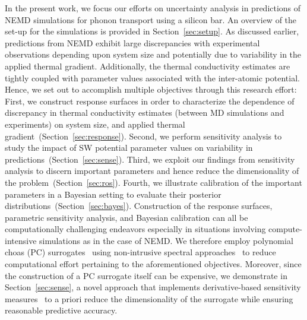 In the present work, we focus our efforts on uncertainty analysis in predictions of NEMD simulations
for phonon transport using a silicon bar. An overview of the set-up for the simulations is
provided in Section~\ref{sec:setup}. As discussed earlier, predictions from NEMD
exhibit large discrepancies with experimental observations depending upon system size and potentially
due to variability in the applied thermal gradient. Additionally, the thermal conductivity estimates are
tightly coupled with parameter values associated with the inter-atomic potential. Hence, we set out to
accomplish multiple objectives through this research effort: First, we construct response surfaces
in order to characterize the dependence of discrepancy in thermal conductivity estimates (between
MD simulations and experiments) on system size, and applied thermal gradient~(Section~\ref{sec:response}).
Second, we perform sensitivity analysis to study the impact of SW potential parameter values on 
variability in predictions~(Section~\ref{sec:sense}).
Third, we exploit our findings from sensitivity analysis to discern important parameters and hence
reduce the dimensionality of the problem~(Section~\ref{sec:ros}). Fourth, we illustrate calibration
of the important parameters in a Bayesian setting to evaluate their posterior
distributions~(Section~\ref{sec:bayes}). Construction of the
response surfaces, parametric sensitivity analysis, and Bayesian calibration can all be computationally
challenging endeavors especially in situations involving compute-intensive simulations as in the
case of NEMD. We therefore employ polynomial choas (PC) surrogates~\cite{Xiu:2002,Ghanem:1990}
using non-intrusive spectral approaches~\cite{Olivier:2010} to reduce computational effort pertaining
to the aforementioned objectives. Moreover, since the construction of a PC surrogate itself can be
expensive, we demonstrate in Section~\ref{sec:sense}, a novel approach that implements derivative-based
sensitivity measures~\cite{Sobol:2010} to a priori reduce the dimensionality of the surrogate while
ensuring reasonable predictive accuracy. 
